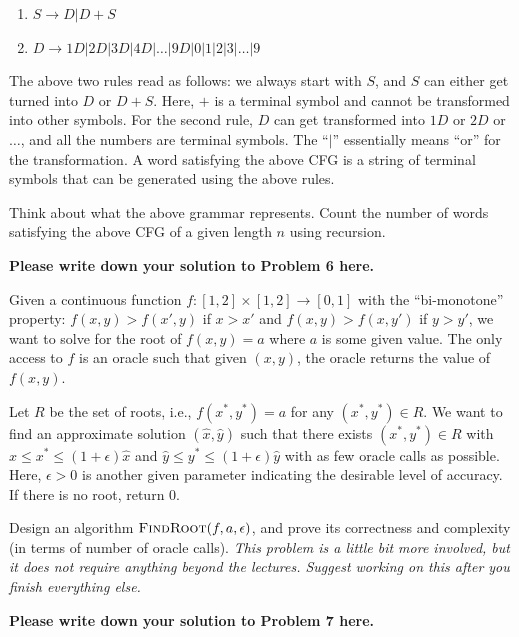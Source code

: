 \documentclass[letterpaper, 11pt]{article}
\newcommand{\1}{\mathds{1}}	%
\theoremstyle{definition}
\begin{document}
\begin{enumerate}
    \item $S \rightarrow D | D + S$
    \item $D \rightarrow 1D | 2D | 3D | 4D | \ldots |9D |0|1|2|3|\ldots|9$
\end{enumerate}

The above two rules read as follows: we always start with $S$, and $S$ can either get turned into $D$ or $D+S$. Here, $+$ is a terminal symbol and cannot be transformed into other symbols. For the second rule, $D$ can get transformed into $1D$ or $2D$ or $\ldots$, and all the numbers are terminal symbols. The ``$|$'' essentially means ``or'' for the transformation. A word satisfying the above CFG is a string of terminal symbols that can be generated using the above rules.

Think about what the above grammar represents. Count the number of words satisfying the above CFG of a given length $n$ using recursion.


\begin{solution}
\textbf{Please write down your solution to Problem 6 here.}
\end{solution}

Given a continuous function $f : [1,2]\times[1,2] \rightarrow [0,1]$ with the ``bi-monotone'' property: $f(x,y) > f(x',y)$ if $x > x'$ and $f(x,y) > f(x,y')$ if $y > y'$, we want to solve for the root of $f(x,y) = a$ where $a$ is some given value. The only access to $f$ is an oracle such that given $(x,y)$, the oracle returns the value of $f(x,y)$.

Let $R$ be the set of roots, i.e., $f(x^*,y^*) = a$ for any $(x^*,y^*) \in R$. We want to find an approximate solution $(\hat{x},\hat{y})$ such that there exists $(x^*,y^*) \in R$ with $\hat{x} \leq x^* \leq (1+\epsilon) \hat{x}$ and $\hat{y} \leq y^* \leq (1+\epsilon) \hat{y}$ with as few oracle calls as possible. Here, $\epsilon > 0$ is another given parameter indicating the desirable level of accuracy. If there is no root, return $0$.

Design an algorithm $\textsc{FindRoot}(f, a, \epsilon)$, and prove its correctness and complexity (in terms of number of oracle calls). \emph{This problem is a little bit more involved, but it does not require anything beyond the lectures. Suggest working on this after you finish everything else.}

\begin{solution}
\textbf{Please write down your solution to Problem 7 here.}
\end{solution}
\end{document}
